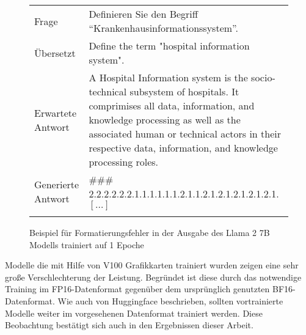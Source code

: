 \begin{figure}
    \begin{tabularx}{\textwidth}{lX}
        \toprule
        Frage              & Definieren Sie den Begriff \enquote{Krankenhausinformationssystem}.                                                                                                                                                                                                    \\
        Übersetzt          & Define the term "hospital information system".                                                                                                                                                                                                                         \\
        Erwartete Antwort  & A Hospital Information system is the socio-technical subsystem of hospitals. It comprimises all data, information, and knowledge processing as well as the associated human or technical actors in their respective data, information, and knowledge processing roles. \\
        Generierte Antwort & \#\#\# 2.2.2.2.2.2.1.1.1.1.1.1.2.1.1.2.1.2.1.2.1.2.1.2.1. $[\dots]$                                                                                                                                                                                                    \\
        \bottomrule                                                                                                                                                                                                                                                                                 \\
    \end{tabularx}
    \caption{Beispiel für Formatierungsfehler in der Ausgabe des Llama 2 7B Modells trainiert auf 1 Epoche}\label{fig:formatting-errors}
\end{figure}

Modelle die mit Hilfe von V100 Grafikkarten trainiert wurden zeigen eine sehr große Verschlechterung der Leistung.
Begründet ist diese durch das notwendige Training im FP16-Datenformat gegenüber dem ursprünglich genutzten BF16-Datenformat.
Wie auch von Huggingface beschrieben, sollten vortrainierte Modelle weiter im vorgesehenen Datenformat trainiert werden.
Diese Beobachtung bestätigt sich auch in den Ergebnissen dieser Arbeit.\\


